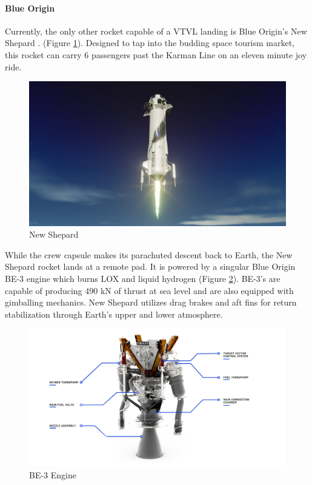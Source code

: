 \paragraph{Blue Origin}

Currently, the only other rocket capable of a VTVL landing is Blue Origin's New Shepard \cite{blue-origin-website}. (Figure \ref{fig:BO}). Designed to tap into the budding space tourism market, this rocket can carry 6 passengers past the Karman Line on an eleven minute joy ride. 

\begin{figure}[H]
    \centering
    \includegraphics[scale=0.20]{src/figs/NewShepard2.jpg}
    \caption{New Shepard}
    \label{fig:BO}
\end{figure}

While the crew capsule makes its parachuted descent back to Earth, the New Shepard rocket lands at a remote pad. It is powered by a singular Blue Origin BE-3 engine which burns LOX and liquid hydrogen (Figure \ref{fig:BE3}). BE-3's are capable of producing 490 kN of thrust at sea level and are also equipped with gimballing mechanics. New Shepard utilizes drag brakes and aft fins for return stabilization through Earth's upper and lower atmosphere. 

\begin{figure}[H]
    \centering
    \includegraphics[scale = 0.5]{src/figs/BE-3_Engine.png}
    \caption{BE-3 Engine}
    \label{fig:BE3}
\end{figure}

